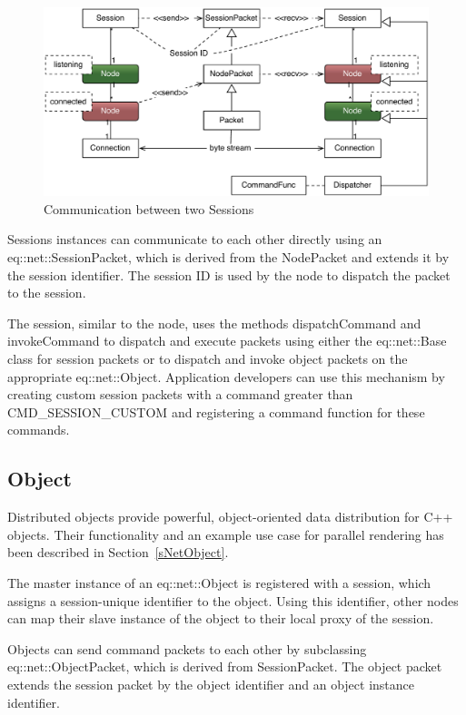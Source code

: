 \documentclass[10pt,a4]{scrartcl}
\newcommand{\sref}[1]{Section~\ref{#1}}
\begin{document}
\begin{figure}
  \includegraphics[width=.618\textwidth]{images/netSession.pdf}
  {\caption{\small\label{fNetSession}Communication between two Sessions}}
\end{figure}
Sessions instances can communicate to each other directly using an
\textsf{eq::net::Ses\-sion\-Packet}, which is derived from the
\textsf{NodePacket} and extends it by the session identifier. The
session ID is used by the node to dispatch the packet to the session.

The session, similar to the node, uses the methods
\textsf{dispatchCommand} and \textsf{invokeCommand} to dispatch and
execute packets using either the \textsf{eq::net::Base} class for
session packets or to dispatch and invoke object packets on the
appropriate \textsf{eq::net::Object}. Application developers can use
this mechanism by creating custom session packets with a command greater
than \textsf{CMD\_SESSION\_CUSTOM} and registering a command function
for these commands.


\subsection{\label{sNetObject2}Object}

Distributed objects provide powerful, object-oriented data
distribution for C++ objects. Their functionality and an example use
case for parallel rendering has been described in \sref{sNetObject}.

The master instance of an \textsf{eq::net::Object} is registered with a
session, which assigns a session-unique identifier to the object. Using
this identifier, other nodes can map their slave instance of the object
to their local proxy of the session.

Objects can send command packets to each other by subclassing
\textsf{eq::net::Ob\-ject\-Packet}, which is derived from
\textsf{SessionPacket}. The object packet extends the session packet by
the object identifier and an object instance identifier.
\end{document}
